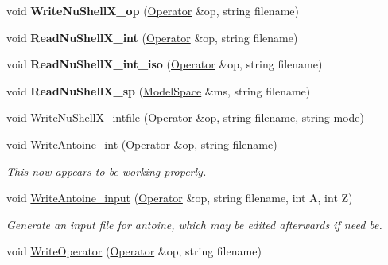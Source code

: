 \begin{DoxyCompactItemize}
\item 
void {\bfseries Write\+Nu\+Shell\+X\+\_\+op} (\hyperlink{classOperator}{Operator} \&op, string filename)\hypertarget{classReadWrite_a5a0bd2b64e5c2e7fc4d7de4301b8a5f9}{}\label{classReadWrite_a5a0bd2b64e5c2e7fc4d7de4301b8a5f9}

\item 
void {\bfseries Read\+Nu\+Shell\+X\+\_\+int} (\hyperlink{classOperator}{Operator} \&op, string filename)\hypertarget{classReadWrite_a380dd0fc6e0fb36b68f573c463b34bfd}{}\label{classReadWrite_a380dd0fc6e0fb36b68f573c463b34bfd}

\item 
void {\bfseries Read\+Nu\+Shell\+X\+\_\+int\+\_\+iso} (\hyperlink{classOperator}{Operator} \&op, string filename)\hypertarget{classReadWrite_adac460de5ce7f9367ee9cc454bb797c3}{}\label{classReadWrite_adac460de5ce7f9367ee9cc454bb797c3}

\item 
void {\bfseries Read\+Nu\+Shell\+X\+\_\+sp} (\hyperlink{classModelSpace}{Model\+Space} \&ms, string filename)\hypertarget{classReadWrite_ae0cdf48d1f44c8585a684fadb4ad58c8}{}\label{classReadWrite_ae0cdf48d1f44c8585a684fadb4ad58c8}

\item 
void \hyperlink{classReadWrite_aba64e4422362222ce77f684032a99db0}{Write\+Nu\+Shell\+X\+\_\+intfile} (\hyperlink{classOperator}{Operator} \&op, string filename, string mode)
\item 
void \hyperlink{classReadWrite_a371194595d9412cbb8f1b432a6526f5a}{Write\+Antoine\+\_\+int} (\hyperlink{classOperator}{Operator} \&op, string filename)\hypertarget{classReadWrite_a371194595d9412cbb8f1b432a6526f5a}{}\label{classReadWrite_a371194595d9412cbb8f1b432a6526f5a}

\begin{DoxyCompactList}\small\item\em This now appears to be working properly. \end{DoxyCompactList}\item 
void \hyperlink{classReadWrite_a44ca3ecdadcdccb047d34ab71be5b262}{Write\+Antoine\+\_\+input} (\hyperlink{classOperator}{Operator} \&op, string filename, int A, int Z)\hypertarget{classReadWrite_a44ca3ecdadcdccb047d34ab71be5b262}{}\label{classReadWrite_a44ca3ecdadcdccb047d34ab71be5b262}

\begin{DoxyCompactList}\small\item\em Generate an input file for antoine, which may be edited afterwards if need be. \end{DoxyCompactList}\item 
void \hyperlink{classReadWrite_a771ed1ac7ca0cc9cb6a209da170dd351}{Write\+Operator} (\hyperlink{classOperator}{Operator} \&op, string filename)\hypertarget{classReadWrite_a771ed1ac7ca0cc9cb6a209da170dd351}{}\label{classReadWrite_a771ed1ac7ca0cc9cb6a209da170dd351}


\end{DoxyCompactItemize}

